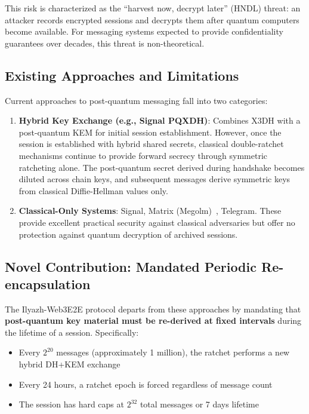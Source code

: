 \documentclass[11pt,a4paper,oneside]{article}
\begin{document}
This risk is characterized as the ``harvest now, decrypt later'' (HNDL) threat: an attacker records encrypted sessions and decrypts them after quantum computers become available. For messaging systems expected to provide confidentiality guarantees over decades, this threat is non-theoretical.

\subsection{Existing Approaches and Limitations}

Current approaches to post-quantum messaging fall into two categories:

\begin{enumerate}
\item \textbf{Hybrid Key Exchange (e.g., Signal PQXDH)}: Combines X3DH with a post-quantum KEM for initial session establishment. However, once the session is established with hybrid shared secrets, classical double-ratchet mechanisms continue to provide forward secrecy through symmetric ratcheting alone. The post-quantum secret derived during handshake becomes diluted across chain keys, and subsequent messages derive symmetric keys from classical Diffie-Hellman values only.

\item \textbf{Classical-Only Systems}: Signal, Matrix (Megolm)~\cite{matrix}, Telegram. These provide excellent practical security against classical adversaries but offer no protection against quantum decryption of archived sessions.
\end{enumerate}

\subsection{Novel Contribution: Mandated Periodic Re-encapsulation}

The Ilyazh-Web3E2E protocol departs from these approaches by mandating that \textbf{post-quantum key material must be re-derived at fixed intervals} during the lifetime of a session. Specifically:

\begin{itemize}
\item Every $2^{20}$ messages (approximately 1 million), the ratchet performs a new hybrid DH+KEM exchange
\item Every 24 hours, a ratchet epoch is forced regardless of message count
\item The session has hard caps at $2^{32}$ total messages or 7 days lifetime
\end{itemize}
\end{document}
